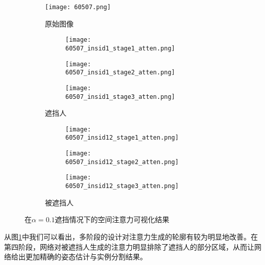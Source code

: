 \begin{figure}[H]
	\centering
	\begin{subfigure}{0.3\linewidth}
		\texttt{[image: 60507.png]}
		\caption{原始图像}
	\end{subfigure}
	\begin{subfigure}{0.3\textwidth}
		\centering
		\begin{subfigure}{\linewidth}
			\texttt{[image: 60507\_insid1\_stage1\_atten.png]}
		\end{subfigure}
		\vskip2pt
		\begin{subfigure}{\linewidth}
			\texttt{[image: 60507\_insid1\_stage2\_atten.png]}
		\end{subfigure}
		\vskip2pt
		\begin{subfigure}{\linewidth}
			\texttt{[image: 60507\_insid1\_stage3\_atten.png]}
		\end{subfigure}
		\caption{遮挡人}
	\end{subfigure}
	\begin{subfigure}{0.3\textwidth}
		\centering
		\begin{subfigure}{\linewidth}
			\texttt{[image: 60507\_insid12\_stage1\_atten.png]}
		\end{subfigure}
		\vskip2pt
		\begin{subfigure}{\linewidth}
			\texttt{[image: 60507\_insid12\_stage2\_atten.png]}
		\end{subfigure}
		\vskip2pt
		\begin{subfigure}{\linewidth}
			\texttt{[image: 60507\_insid12\_stage3\_atten.png]}
		\end{subfigure}
		\caption{被遮挡人}
	\end{subfigure}
	\begin{minipage}{0.05\linewidth}
		
		\vskip2cm
		
		\vskip2cm
	\end{minipage}
	\caption{在$\alpha=0.1$遮挡情况下的空间注意力可视化结果}
	\label{fig:attenvis}
\end{figure}

从图\ref{fig:attenvis}中我们可以看出，多阶段的设计对注意力生成的轮廓有较为明显地改善。在第四阶段，网络对被遮挡人生成的注意力明显排除了遮挡人的部分区域，从而让网络给出更加精确的姿态估计与实例分割结果。

